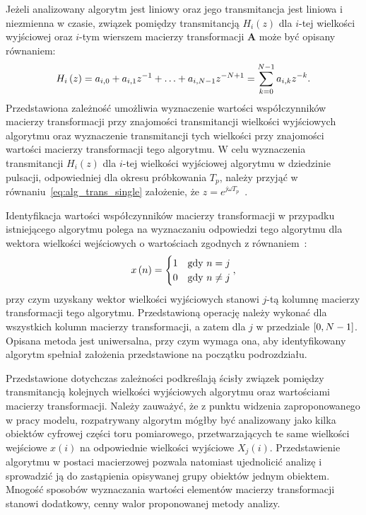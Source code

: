 Jeżeli analizowany algorytm jest liniowy oraz jego transmitancja jest liniowa i niezmienna w czasie, związek pomiędzy transmitancją $H_{i}(z)$ dla $i$-tej wielkości wyjściowej oraz $i$-tym wierszem macierzy transformacji $\mathbf{A}$ może być opisany równaniem:
\begin{equation}
H_{i} \left(z\right) = a_{i, 0} + a_{i, 1} z^{-1} + \hdots + a_{i, N-1} z^{-N+1} = \sum _{k = 0} ^{N-1} a_{i, k} z^{-k} \label{eq:alg_trans_single}.
\end{equation}
Przedstawiona zależność umożliwia wyznaczenie wartości współczynników macierzy transformacji przy znajomości transmitancji wielkości wyjściowych algorytmu oraz wyznaczenie transmitancji tych wielkości przy znajomości wartości macierzy transformacji tego algorytmu. W celu wyznaczenia transmitancji $H_{i}(z)$ dla $i$-tej wielkości wyjściowej algorytmu w dziedzinie pulsacji, odpowiedniej dla okresu próbkowania $T_{p}$, należy przyjąć w równaniu~\eqref{eq:alg_trans_single} założenie, że $z = e^{j\omega T_{p}}$~\cite{proakis_dsp}.

Identyfikacja wartości współczynników macierzy transformacji w przypadku istniejącego algorytmu polega na wyznaczaniu odpowiedzi tego algorytmu dla wektora wielkości wejściowych o wartościach zgodnych z równaniem~\cite{jakubiec_algorithms, jakubiec_system}:
\begin{equation}
x \emb{n} =
\begin{cases}
	1 & $gdy$~n = j \\
	0 & $gdy$~n \neq j
\end{cases}
\label{eq:wt_ident},
\end{equation}
przy czym uzyskany wektor wielkości wyjściowych stanowi $j$-tą kolumnę macierzy transformacji tego algorytmu. Przedstawioną operację należy wykonać dla wszystkich kolumn macierzy transformacji, a zatem dla $j$ w przedziale $\interval{0}{N-1}$. Opisana metoda jest uniwersalna, przy czym wymaga ona, aby identyfikowany algorytm spełniał założenia przedstawione na początku podrozdziału.

Przedstawione dotychczas zależności podkreślają ścisły związek pomiędzy transmitancją kolejnych wielkości wyjściowych algorytmu oraz wartościami macierzy transformacji. Należy zauważyć, że z punktu widzenia zaproponowanego w pracy modelu, rozpatrywany algorytm mógłby być analizowany jako kilka obiektów cyfrowej części toru pomiarowego, przetwarzających te same wielkości wejściowe $x(i)$ na odpowiednie wielkości wyjściowe $X_{j}(i)$. Przedstawienie algorytmu w postaci macierzowej pozwala natomiast ujednolicić analizę i sprowadzić ją do zastąpienia opisywanej grupy obiektów jednym obiektem. Mnogość sposobów wyznaczania wartości elementów macierzy transformacji stanowi dodatkowy, cenny walor proponowanej metody analizy.

